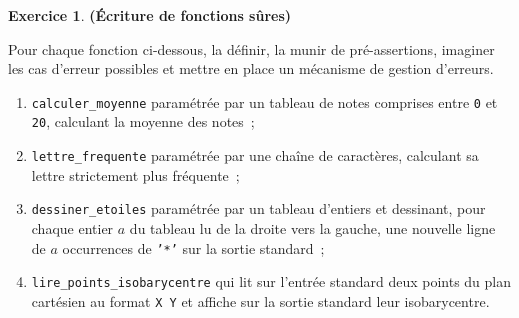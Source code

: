 \documentclass[12pt]{article}
\theoremstyle{definition}
\newtheorem{Exercice}{Exercice}
\begin{document}
\begin{Exercice} {\bf (Écriture de fonctions sûres)}\smallskip

Pour chaque fonction ci-dessous, la définir, la munir de pré-assertions,
imaginer les cas d'erreur possibles et mettre en place un mécanisme de
gestion d'erreurs.

\begin{enumerate}
    \item {\tt calculer\_moyenne} paramétrée par 
    un tableau de notes comprises entre {\tt 0} et {\tt 20}, calculant 
    la moyenne des notes~;
    \smallskip
    
    \item {\tt lettre\_frequente} paramétrée par une chaîne de caractères,
    calculant sa lettre strictement plus fréquente~;
    \smallskip
    
    \item {\tt dessiner\_etoiles} paramétrée par un tableau d'entiers 
    et dessinant, pour chaque entier $a$ du tableau lu de la droite vers 
    la gauche, une nouvelle ligne de $a$ occurrences de {\tt '*'} sur la 
    sortie standard~;
    \smallskip
    
    \item {\tt lire\_points\_isobarycentre} qui lit sur l'entrée standard 
    deux points du plan cartésien au format {\tt X Y} et affiche sur 
    la sortie standard leur isobarycentre.
\end{enumerate}
\end{Exercice}
\bigskip
\end{document}
